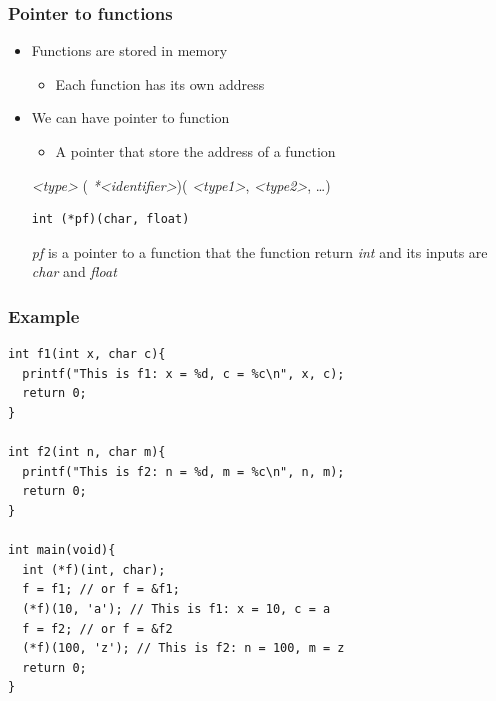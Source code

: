 \documentclass{../c-lecture}
\begin{document}
\begin{frame}[fragile]
  \frametitle{Pointer to functions}
  \begin{itemize}
    \item Functions are stored in memory
    \begin{itemize}
      \item Each function has its own address
    \end{itemize}
    \item We can have pointer to function
    \begin{itemize}
      \item A pointer that store the address of a function
    \end{itemize}
    \begin{block}{}
      \textit{\color{YellowOrange} <type>} (
      \textit{\color{LimeGreen}*<identifier>})(
      \textit{\color{Cyan}<type1>},
      \textit{\color{Cyan}<type2>}, \ldots)
    \end{block}
    \begin{verbatim}
int (*pf)(char, float)
    \end{verbatim}
    \begin{block}{}
      \textit{\color{LimeGreen} pf} is a pointer to a function that the
      function return \textit{\color{YellowOrange} int} and its inputs are
      \textit{\color{Cyan} char} and
      \textit{\color{Cyan} float}
    \end{block}
  \end{itemize}
\end{frame}

\begin{frame}[fragile]
  \frametitle{Example}
  \scriptsize
  \begin{verbatim}
int f1(int x, char c){
  printf("This is f1: x = %d, c = %c\n", x, c);
  return 0;
}

int f2(int n, char m){
  printf("This is f2: n = %d, m = %c\n", n, m);
  return 0;
}

int main(void){
  int (*f)(int, char);
  f = f1; // or f = &f1;
  (*f)(10, 'a'); // This is f1: x = 10, c = a
  f = f2; // or f = &f2
  (*f)(100, 'z'); // This is f2: n = 100, m = z
  return 0;
}
  \end{verbatim}
\end{frame}
\end{document}
